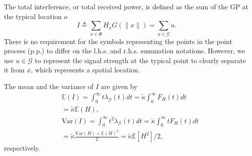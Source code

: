\documentclass[lettersize,journal]{IEEEtran}
\begin{document}
The total interference, or total received power, is defined as the sum of the GP at the typical location $\textit{o}$ 
\begin{equation}
  \label{eq:totpow}
  I \triangleq \sum_{x \in \Phi} H_x G(\|x\|) = \sum_{u \in \mathcal{G}} u.
\end{equation}
There is no requirement for the symbols representing the points in the point process (p.p.) to differ on the l.h.s. and r.h.s. summation notations. However, we use $u \in \mathcal{G}$ to represent the signal strength at the typical point to clearly separate it from $x$, which represents a spatial location.




The mean and the variance of $I$ are given by
\begin{align}
  \label{eq:totmean}
  &\mathbb{E}\left(I \right) = \int_{0}^{\infty} t\lambda_{\mathcal{G}}(t) dt = \tilde{\kappa} \int_{0}^{\infty}F_H(t) dt \nonumber \\
  &=\tilde{\kappa} \mathbb{E}(H), \\\
  \label{eq:totvar}
  &\text{Var}\left(I \right) = \int_{0}^{\infty} t^2\lambda_{\mathcal{G}}(t) dt= \tilde{\kappa} \int_0^{\infty}tF_H(t) dt  \nonumber \\
  &= \tilde{\kappa} \frac{\text{Var}(H) + \mathbb{E}(H)^2}{2} = \tilde{\kappa}  \mathbb{E}[H^2]/2,
\end{align}
respectively.

\end{document}
